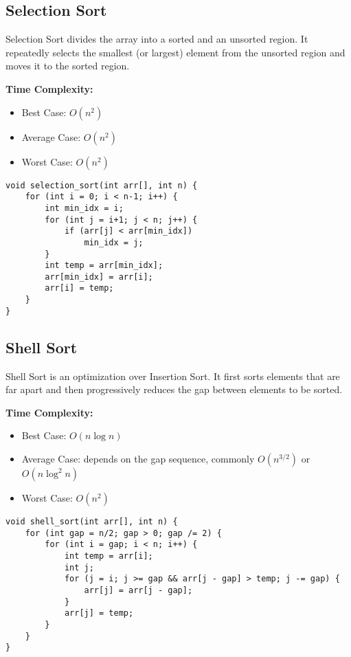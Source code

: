 \subsection{Selection Sort}
Selection Sort divides the array into a sorted and an unsorted 
region. It repeatedly selects the smallest (or largest) element 
from the unsorted region and moves it to the sorted region.

\textbf{Time Complexity:}
\begin{itemize}
    \item Best Case: $O(n^2)$
    \item Average Case: $O(n^2)$
    \item Worst Case: $O(n^2)$
\end{itemize}

\begin{lstlisting}[caption=Selection Sort]
void selection_sort(int arr[], int n) {
    for (int i = 0; i < n-1; i++) {
        int min_idx = i;
        for (int j = i+1; j < n; j++) {
            if (arr[j] < arr[min_idx])
                min_idx = j;
        }
        int temp = arr[min_idx];
        arr[min_idx] = arr[i];
        arr[i] = temp;
    }
}
\end{lstlisting}
\subsection{Shell Sort}
Shell Sort is an optimization over Insertion Sort. 
It first sorts elements that are far apart and then progressively 
reduces the gap between elements to be sorted.

\textbf{Time Complexity:}
\begin{itemize}
    \item Best Case: $O(n \log n)$
    \item Average Case: depends on the gap sequence, commonly $O(n^{3/2})$ or $O(n \log^2 n)$
    \item Worst Case: $O(n^2)$
\end{itemize}

\begin{lstlisting}[caption=Shell Sort]
void shell_sort(int arr[], int n) {
    for (int gap = n/2; gap > 0; gap /= 2) {
        for (int i = gap; i < n; i++) {
            int temp = arr[i];
            int j;
            for (j = i; j >= gap && arr[j - gap] > temp; j -= gap) {
                arr[j] = arr[j - gap];
            }
            arr[j] = temp;
        }
    }
}
\end{lstlisting}